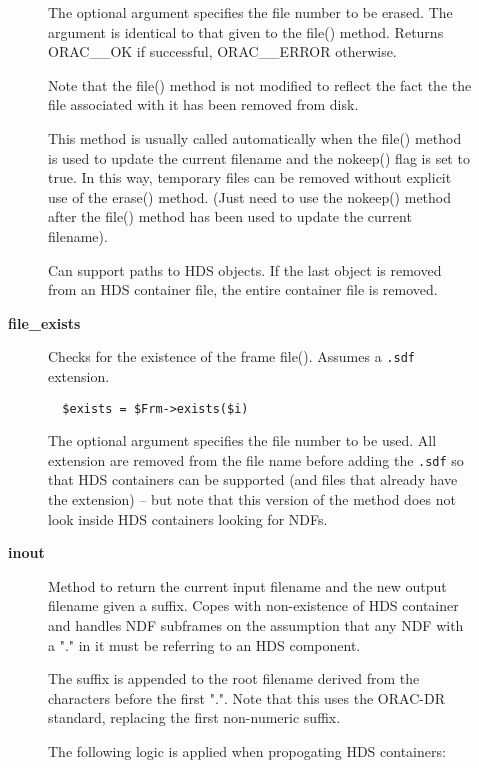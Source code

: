 \begin{description}
\begin{description}
The optional argument specifies the file number to be erased.
The argument is identical to that given to the file() method.
Returns ORAC\_\_OK if successful, ORAC\_\_ERROR otherwise.



Note that the file() method is not modified to reflect the
fact the the file associated with it has been removed from disk.



This method is usually called automatically when the file()
method is used to update the current filename and the nokeep()
flag is set to true. In this way, temporary files can be removed
without explicit use of the erase() method. (Just need to
use the nokeep() method after the file() method has been used
to update the current filename).



Can support paths to HDS objects. If the last object is removed from
an HDS container file, the entire container file is removed.


\item[{\textbf{file\_exists}}] \mbox{}

Checks for the existence of the frame file(). Assumes a \texttt{.sdf}
extension.

\begin{verbatim}
  $exists = $Frm->exists($i)
\end{verbatim}


The optional argument specifies the file number to be used.
All extension are removed from the file name before adding the
\texttt{.sdf} so that HDS containers can be supported (and files
that already have the extension)  -- but note that
this version of the method does not look inside HDS containers
looking for NDFs.


\item[{\textbf{inout}}] \mbox{}

Method to return the current input filename and the new output
filename given a suffix.  Copes with non-existence of HDS container
and handles NDF subframes on the assumption that any NDF with a
"." in it must be referring to an HDS component.



The suffix is appended to the root filename derived from the characters
before the first ".". Note that this uses the ORAC-DR standard, replacing
the first non-numeric suffix.



The following logic is applied when propogating HDS containers:


\end{description}
\end{description}
